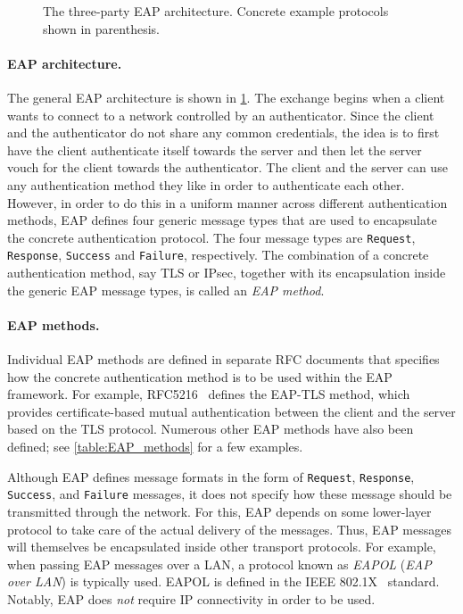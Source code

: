 \begin{figure}
	\centering
	

	\caption{The three-party EAP architecture.
	Concrete example protocols shown in parenthesis.}
	\label{fig:EAP-architecture}
\end{figure}


\paragraph{EAP architecture.}
The general EAP architecture is shown in \cref{fig:EAP-architecture}.
The exchange begins when a client wants to connect to a network controlled by an authenticator.
Since the client and the authenticator do not share any common credentials,
the idea is to first have the client authenticate itself towards the server and then let the server vouch for the client towards the authenticator.
The client and the server can use any authentication method they like in order to authenticate each other.
However,
in order to do this in a uniform manner across different authentication methods,
EAP defines four generic message types that are used to encapsulate the concrete authentication protocol.
The four message types are \texttt{Request}, \texttt{Response}, \texttt{Success} and \texttt{Failure},
respectively.
The combination of a concrete authentication method,
say TLS or IPsec, together with its encapsulation inside the generic EAP message types, is called an \emph{EAP method}.

\paragraph{EAP methods.}

Individual EAP methods are defined in separate RFC documents that specifies how the concrete authentication method is to be used within the EAP framework. 
For example, RFC5216~\cite{IETF:RFC5216:EAP-TLS} defines the EAP-TLS method,
which provides certificate-based mutual authentication between the client and the server based on the TLS protocol.
Numerous other EAP methods have also been defined;
see \cref{table:EAP_methods} for a few examples. 


Although EAP defines message formats in the form of \texttt{Request}, \texttt{Response}, \texttt{Success}, and \texttt{Failure} messages,
it does not specify how these message should be transmitted through the network.
For this, EAP depends on some lower-layer protocol to take care of the actual delivery of the messages.
Thus,
EAP messages will themselves be encapsulated inside other transport protocols.
For example,
when passing EAP messages over a LAN,
a protocol known as \emph{EAPOL} (\emph{EAP over LAN}) is typically used. 
EAPOL is defined in the IEEE 802.1X~\cite{IEEE:2010:802.1X} standard.
Notably,
EAP does \emph{not} require IP connectivity in order to be used.


